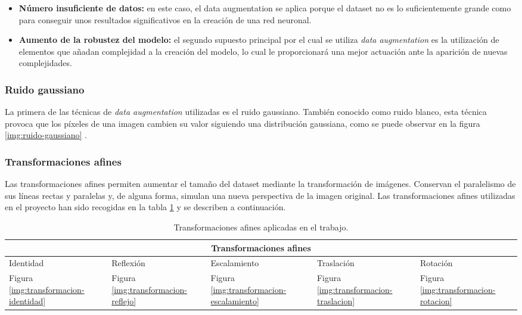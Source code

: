 \begin{itemize}
	\item \textbf{Número insuficiente de datos:} en este caso, el data augmentation se aplica porque el dataset no es lo suficientemente grande como para conseguir unos resultados 
significativos en la creación de una red neuronal.
	\item \textbf{Aumento de la robustez del modelo:} el segundo supuesto principal por el cual se utiliza \textit{data augmentation} es la utilización de elementos que añadan complejidad a la
creación del modelo, lo cual le proporcionará una mejor actuación ante la aparición de nuevas complejidades.
\end{itemize}

\subsubsection{Ruido gaussiano}

La primera de las técnicas de \textit{data augmentation} utilizadas es el ruido gaussiano. 
También conocido como ruido blanco, esta técnica provoca que los píxeles de una imagen cambien su valor siguiendo una distribución gaussiana, como se puede observar en la figura \ref{img:ruido-gaussiano} .


\subsubsection{Transformaciones afines} \label{transformacionesafines}

Las transformaciones afines permiten aumentar el tamaño del dataset mediante la transformación de imágenes. Conservan el paralelismo de sus líneas rectas y paralelas y, de alguna forma, simulan una nueva perspectiva de la imagen original.
Las transformaciones afines utilizadas en el proyecto han sido recogidas en la tabla \ref{tabla:transformaciones-afines} y se describen a continuación.

\begin{table}[h!]
\begin{tabular}{ |p{2cm}|p{1.8cm}|p{2.2cm} |p{2cm}|p{1.8cm}|}
	\hline
	\multicolumn{5}{|c|}{Transformaciones afines}\\ 
	\hline
	Identidad & Reflexión &Escalamiento & Traslación  & Rotación\\
	\hline
	Figura \ref{img:transformacion-identidad} & Figura \ref{img:transformacion-reflejo}     & Figura \ref{img:transformacion-escalamiento} &   Figura \ref{img:transformacion-traslacion} &   Figura \ref{img:transformacion-rotacion}\\
	\hline
\end{tabular}
\caption{\label{tabla:transformaciones-afines}Transformaciones afines aplicadas en el trabajo.}
\end{table}


